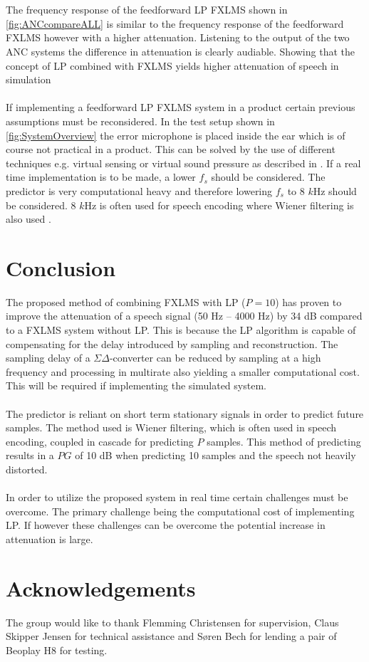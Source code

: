 \\\\
The frequency response of the feedforward LP FXLMS shown in \autoref{fig:ANCcompareALL} is similar to the frequency response of the feedforward FXLMS however with a higher attenuation. Listening to the output of the two ANC systems the difference in attenuation is clearly audiable. Showing that the concept of LP combined with FXLMS yields higher attenuation of speech in simulation     
\\\\
If implementing a feedforward LP FXLMS system in a product certain previous assumptions must be reconsidered. In the test setup shown in \autoref{fig:SystemOverview} the error microphone is placed inside the ear which is of course not practical in a product. This can be solved by the use of different techniques e.g. virtual sensing or virtual sound pressure as described in \cite{Hansen2}. If a real time implementation is to be made, a lower $f_s$ should be considered. The predictor is very computational heavy and therefore lowering $f_s$ to 8 $k$Hz should be considered. 8 $k$Hz is often used for speech encoding where Wiener filtering is also used \cite{Speech}.



\section{Conclusion}
The proposed method of combining FXLMS with LP ($P=10$) has proven to improve the attenuation of a speech signal (50 Hz -- 4000 Hz) by 34 dB compared to a FXLMS system without LP. This is because the LP algorithm is capable of compensating for the delay introduced by sampling and reconstruction. The sampling delay of a $\Sigma\Delta$-converter can be reduced by sampling at a high frequency and processing in multirate also yielding a smaller computational cost. This will be required if implementing the simulated system.    
\\\\
The predictor is reliant on short term stationary signals in order to predict future samples. The method used is Wiener filtering, which is often used in speech encoding, coupled in cascade for predicting $P$ samples. This method of predicting results in a $PG$ of 10 dB when predicting 10 samples and the speech not heavily distorted.    
\\\\
In order to utilize the proposed system in real time certain challenges must be overcome. The primary challenge being the computational cost of implementing LP. If however these challenges can be overcome the potential increase in attenuation is large.   



\section*{Acknowledgements}
The group would like to thank Flemming Christensen for supervision, Claus Skipper Jensen for technical assistance and Søren Bech for lending a pair of Beoplay H8 for testing. 
